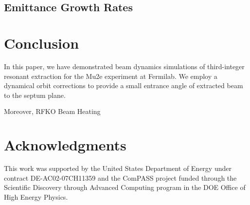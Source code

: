 \documentclass[aps,prstab,onecolumn,preprint,endfloats,11pt]{revtex4-1}
\begin{document}
\subsection{\label{sec:emit}Emittance Growth Rates}





\clearpage
\section{\label{sec:conclusion}Conclusion}

In this paper, we have demonstrated beam dynamics simulations of third-integer resonant extraction for the Mu2e experiment at Fermilab. We employ a dynamical orbit corrections to provide a small entrance angle of extracted beam to the septum plane. 



Moreover, RFKO Beam Heating



\section{\label{thanks}Acknowledgments}

This work was supported by the United States Department of Energy under contract DE-AC02-07CH11359 and the ComPASS project funded through the Scientific Discovery through Advanced Computing program in the DOE Office of High Energy Physics.

\end{document}
